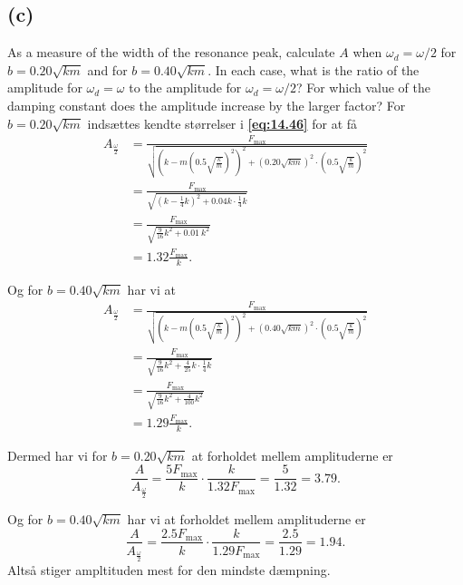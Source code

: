\documentclass[12pt]{article}
\theoremstyle{definition}
\begin{document}
\subsection*{(c)}
As a measure of the width of the resonance peak, calculate $A$ when $\omega_d = \omega / 2$ for $b = \num{0,20} \sqrt{km}$ and for $b = \num{0,40} \sqrt{km}$. In each case, what is the ratio of the amplitude for $\omega_d = \omega$ to the amplitude for $\omega_d = \omega / 2$? For which value of the damping constant does the amplitude increase by the larger factor?
\bigbreak
For $b = \num{0,20} \sqrt{km}$ indsættes kendte størrelser i \textbf{\autoref{eq:14.46}} for at få
\begin{align*}
  A_{\frac{\omega}{2}} &= \frac{F_{\text{max}}}{\sqrt{\left( k - m \left( \num{0,5}\sqrt{\frac{k}{m}} \right)^2 \right)^2 + \left(\num{0,20} \sqrt{km} \right)^2 \cdot  \left( \num{0,5}\sqrt{\frac{k}{m}} \right)^2}} \\
  &= \frac{F_{\text{max}}}{\sqrt{\left( k - \frac{1}{4}k \right)^2 + \num{0,04} k \cdot \frac{1}{4} k}} \\
  &= \frac{F_{\text{max}}}{\sqrt{\frac{9}{16}k^2 + \qty{0,01}{k^2}}} \\
  &= \num{1,32} \frac{F_{\text{max}}}{k}
.\end{align*}

Og for $b = \num{0,40} \sqrt{km}$ har vi at
\begin{align*}
  A_{\frac{\omega}{2}} &= \frac{F_{\text{max}}}{\sqrt{\left( k - m \left( \num{0,5}\sqrt{\frac{k}{m}} \right)^2 \right)^2 + \left( \num{0,40} \sqrt{km} \right)^2 \cdot  \left( \num{0,5}\sqrt{\frac{k}{m}} \right)^2}} \\
  &= \frac{F_{\text{max}}}{\sqrt{\frac{9}{16}k^2 + \frac{4}{25}k \cdot \frac{1}{4} k}} \\
  &= \frac{F_{\text{max}}}{\sqrt{\frac{9}{16}k^2 + \frac{4}{100}k^2}} \\
  &= \num{1,29} \frac{F_{\text{max}}}{k} 
.\end{align*}

Dermed har vi for $b = \num{0,20} \sqrt{km}$ at forholdet mellem amplituderne er
\[ 
\frac{A}{A_{\frac{\omega}{2}}} = \frac{5 F_{\text{max}}}{k} \cdot \frac{k}{\num{1,32} F_{\text{max}}} = \frac{5}{\num{1,32}} = \num{3,79} 
.\]

Og for $b = \num{0,40} \sqrt{km}$ har vi at forholdet mellem amplituderne er
\[ 
\frac{A}{A_{\frac{\omega}{2}}} = \frac{\num{2,5} F_{\text{max}}}{k} \cdot \frac{k}{\num{1,29} F_{\text{max}}} = \frac{\num{2,5} }{\num{1,29} } = \num{1,94} 
.\]
Altså stiger ampltituden mest for den mindste dæmpning.
\end{document}
